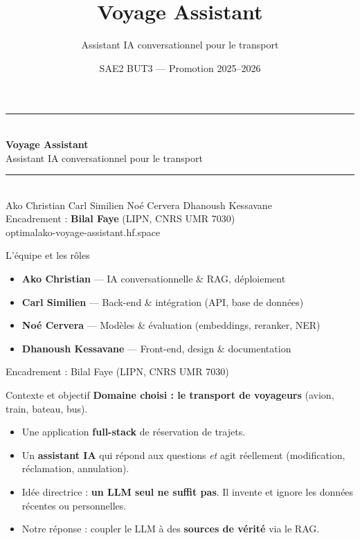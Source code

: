 \documentclass[aspectratio=169,11pt]{beamer}
\title{\textbf{Voyage Assistant}}
\subtitle{Assistant IA conversationnel pour le transport}
\date{SAE2 BUT3 --- Promotion 2025--2026}
\newcommand{\hl}[1]{\textbf{\color{accent}#1}}
\begin{document}
\begin{frame}[plain]
  \centering
  \vspace{0.6cm}
  {\color{accent}\rule{0.85\linewidth}{1.5pt}}\\[0.5cm]
  {\Huge\bfseries\color{dark} Voyage Assistant}\\[0.3cm]
  {\large\color{soft} Assistant IA conversationnel pour le transport}\\[0.4cm]
  {\color{accent}\rule{0.85\linewidth}{1.5pt}}\\[0.7cm]
  {\footnotesize
   Ako Christian \quad\textbullet\quad Carl Similien \quad\textbullet\quad
   Noé Cervera \quad\textbullet\quad Dhanoush Kessavane}\\[0.5cm]
  {\small Encadrement : \textbf{Bilal Faye} (LIPN, CNRS UMR 7030)}\\[0.5cm]
  {\scriptsize\color{soft} optimalako-voyage-assistant.hf.space}
\end{frame}

\begin{frame}{L'équipe et les rôles}
  \begin{itemize}
    \item \hl{Ako Christian} --- IA conversationnelle \& RAG, déploiement
    \item \hl{Carl Similien} --- Back-end \& intégration (API, base de données)
    \item \hl{Noé Cervera} --- Modèles \& évaluation (embeddings, reranker, NER)
    \item \hl{Dhanoush Kessavane} --- Front-end, design \& documentation
  \end{itemize}
  \vfill
  \begin{center}\small\color{soft}
    Encadrement : Bilal Faye (LIPN, CNRS UMR 7030)
  \end{center}
\end{frame}

\begin{frame}{Contexte et objectif}
  \textbf{Domaine choisi : le transport de voyageurs} (avion, train, bateau, bus).
  \vspace{0.4cm}
  \begin{itemize}
    \item Une application \hl{full-stack} de réservation de trajets.
    \item Un \hl{assistant IA} qui répond aux questions \emph{et} agit réellement
          (modification, réclamation, annulation).
    \item Idée directrice : \hl{un LLM seul ne suffit pas}. Il invente et ignore les
          données récentes ou personnelles.
    \item Notre réponse : coupler le LLM à des \hl{sources de vérité} via le RAG.
  \end{itemize}
\end{frame}
\end{document}
